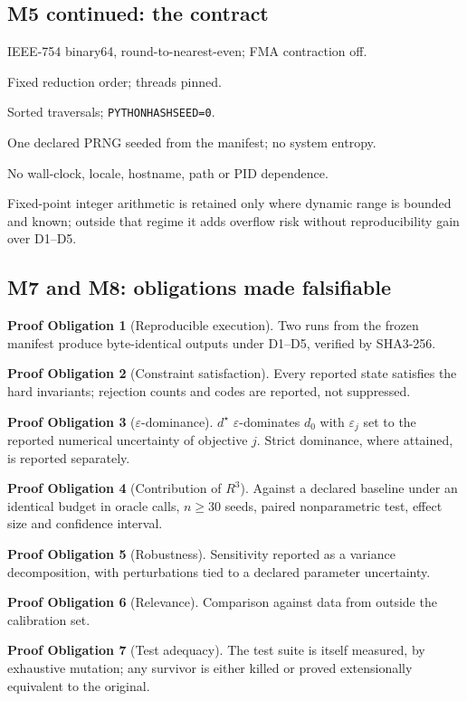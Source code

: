 \documentclass[11pt,a4paper]{article}
\theoremstyle{plain}
\theoremstyle{definition}
\newtheorem{obligation}{Proof Obligation}
\theoremstyle{remark}
\newcommand{\Rc}{R^{3}}
\begin{document}
\subsection{M5 continued: the contract}
\begin{description}[leftmargin=3em,style=nextline]
\item[D1 Rounding] IEEE-754 binary64, round-to-nearest-even; FMA contraction off.
\item[D2 Order] Fixed reduction order; threads pinned.
\item[D3 Iteration] Sorted traversals; \texttt{PYTHONHASHSEED=0}.
\item[D4 Randomness] One declared PRNG seeded from the manifest; no system entropy.
\item[D5 Environment] No wall-clock, locale, hostname, path or PID dependence.
\end{description}
Fixed-point integer arithmetic is retained only where dynamic range is bounded
and known; outside that regime it adds overflow risk without reproducibility
gain over D1--D5.

\subsection{M7 and M8: obligations made falsifiable}
\begin{obligation}[Reproducible execution] Two runs from the frozen manifest
produce byte-identical outputs under D1--D5, verified by SHA3-256.\end{obligation}
\begin{obligation}[Constraint satisfaction] Every reported state satisfies the
hard invariants; rejection counts and codes are reported, not suppressed.\end{obligation}
\begin{obligation}[$\varepsilon$-dominance] $d^\star$ $\varepsilon$-dominates
$d_0$ with $\varepsilon_j$ set to the reported numerical uncertainty of
objective $j$. Strict dominance, where attained, is reported separately.\end{obligation}
\begin{obligation}[Contribution of $\Rc$] Against a declared baseline under an
identical budget in oracle calls, $n\ge 30$ seeds, paired nonparametric test,
effect size and confidence interval.\end{obligation}
\begin{obligation}[Robustness] Sensitivity reported as a variance decomposition,
with perturbations tied to a declared parameter uncertainty.\end{obligation}
\begin{obligation}[Relevance] Comparison against data from outside the
calibration set.\end{obligation}
\begin{obligation}[Test adequacy] The test suite is itself measured, by
exhaustive mutation; any survivor is either killed or proved extensionally
equivalent to the original.\end{obligation}
\end{document}
